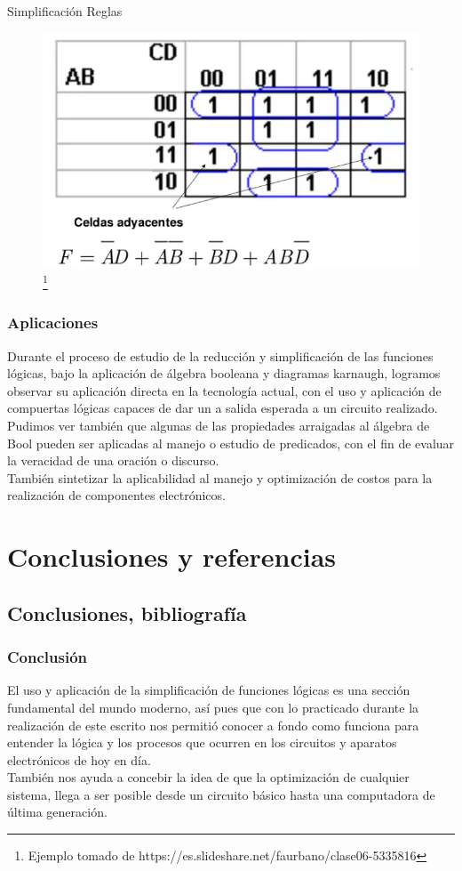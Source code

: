 \documentclass[aspectratio=169]{beamer}
\begin{document}
\begin{frame}{Simplificación Reglas}
    \begin{figure}
        \includegraphics[scale=.4]{ejem/kar/ej_5.png}\footnote{Ejemplo tomado de https://es.slideshare.net/faurbano/clase06-5335816}
    \end{figure}
\end{frame}

\begin{frame}
\frametitle{Aplicaciones}
    Durante el proceso de estudio de la reducción y simplificación de las funciones lógicas, bajo la aplicación de álgebra booleana y diagramas karnaugh, logramos observar su aplicación directa en la tecnología actual, con el uso y aplicación de compuertas lógicas capaces de dar un a salida esperada a un circuito realizado.\\ Pudimos ver también que algunas de las propiedades arraigadas al álgebra de Bool pueden ser aplicadas al manejo o estudio de predicados, con el fin de evaluar la veracidad de una oración o discurso.\\ También sintetizar la aplicabilidad al manejo y optimización de costos para la realización de componentes electrónicos.  
\end{frame}

\section{Conclusiones y referencias}

\subsection{Conclusiones, bibliografía}


\begin{frame}
\frametitle{Conclusión}
El uso y aplicación de la simplificación de funciones lógicas es una sección fundamental del mundo moderno, así pues que con lo practicado durante la realización de este escrito nos permitió conocer a fondo como funciona para entender la lógica y los procesos que ocurren en los circuitos y aparatos electrónicos de hoy en día.\\
También nos ayuda a concebir la idea de que la optimización de cualquier sistema, llega a ser posible desde un circuito básico hasta una computadora de última generación.
\end{frame}
\end{document}
